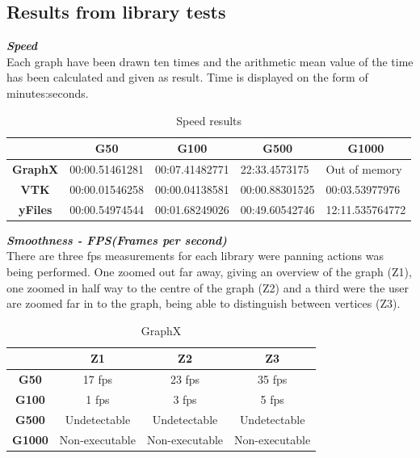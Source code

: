 \documentclass[a4paper,11pt]{kth-mag}
\begin{document}
\newpage
\subsection{Results from library tests}
\label{sec:lib:results}
\textbf{\textit{Speed}}\\
\newline
Each graph have been drawn ten times and the arithmetic mean value of the time has been calculated and given as result. Time is displayed on the form of minutes:seconds.\

\newline
\begin{table}[h]
\centering
\caption{Speed results}
\begin{tabular}{|c|l|l|l|l|}
\hline
\multicolumn{1}{|l|}{} & \multicolumn{1}{c|}{\textbf{G50}} & \multicolumn{1}{c|}{\textbf{G100}} & \multicolumn{1}{c|}{\textbf{G500}} & \multicolumn{1}{c|}{\textbf{G1000}} \\ \hline
\textbf{GraphX}        & 00:00.51461281                    & 00:07.41482771                     & 22:33.4573175                      & Out of memory                       \\ \hline
\textbf{VTK}           & 00:00.01546258                    & 00:00.04138581                     & 00:00.88301525                     & 00:03.53977976                      \\ \hline
\textbf{yFiles}        & 00:00.54974544                    & 00:01.68249026                     & 00:49.60542746                     & 12:11.535764772                     \\ \hline
\end{tabular}
\label{table:librarie-speed}
\end{table}
\newline
\textbf{\textit{Smoothness - FPS(Frames per second)}}\\
\newline
There are three fps measurements for each library were panning actions was being performed. One zoomed out far away, giving an overview of the
graph (Z1), one zoomed in half way to the centre of the graph (Z2) and a third were the user are zoomed far in to the graph, being able to distinguish between vertices (Z3).
\newpage
\begin{table}[h]
\centering
\caption{GraphX}
\begin{tabular}{|c|c|c|c|}
\hline
\multicolumn{1}{|l|}{} & \textbf{Z1}    & \textbf{Z2}    & \textbf{Z3}    \\ \hline
\textbf{G50}           & 17 fps         & 23 fps         & 35 fps         \\ \hline
\textbf{G100}          & 1 fps          & 3 fps          & 5 fps          \\ \hline
\textbf{G500}          & Undetectable   & Undetectable   & Undetectable   \\ \hline
\textbf{G1000}         & Non-executable & Non-executable & Non-executable \\ \hline
\end{tabular}
\label{table-graphx}
\end{table}
\end{document}
